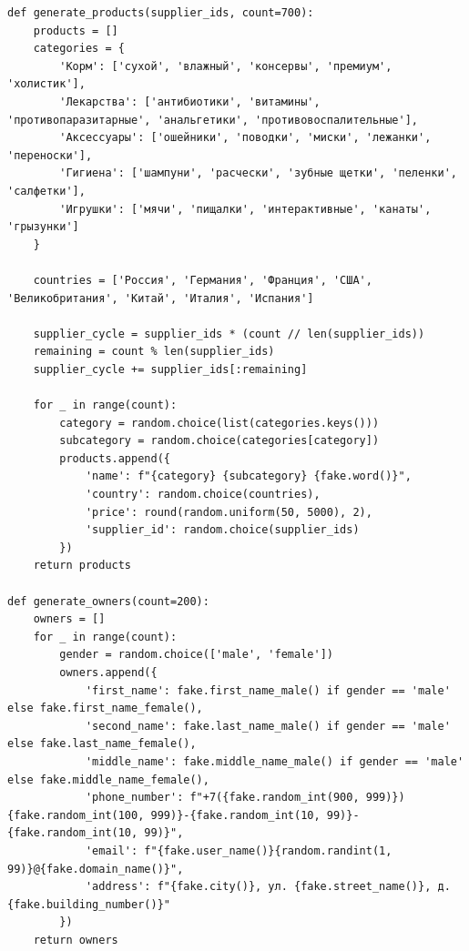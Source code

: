 \documentclass[a4paper]{article}
\begin{document}
\begin{lstlisting}[caption = Генерация значений для таблиц, basicstyle= \scriptsize \ttfamily]
def generate_products(supplier_ids, count=700):
    products = []
    categories = {
        'Корм': ['сухой', 'влажный', 'консервы', 'премиум', 'холистик'],
        'Лекарства': ['антибиотики', 'витамины', 'противопаразитарные', 'анальгетики', 'противовоспалительные'],
        'Аксессуары': ['ошейники', 'поводки', 'миски', 'лежанки', 'переноски'],
        'Гигиена': ['шампуни', 'расчески', 'зубные щетки', 'пеленки', 'салфетки'],
        'Игрушки': ['мячи', 'пищалки', 'интерактивные', 'канаты', 'грызунки']
    }
    
    countries = ['Россия', 'Германия', 'Франция', 'США', 'Великобритания', 'Китай', 'Италия', 'Испания']

    supplier_cycle = supplier_ids * (count // len(supplier_ids))
    remaining = count % len(supplier_ids)
    supplier_cycle += supplier_ids[:remaining]
    
    for _ in range(count):
        category = random.choice(list(categories.keys()))
        subcategory = random.choice(categories[category])
        products.append({
            'name': f"{category} {subcategory} {fake.word()}",
            'country': random.choice(countries),
            'price': round(random.uniform(50, 5000), 2),
            'supplier_id': random.choice(supplier_ids)
        })
    return products

def generate_owners(count=200):
    owners = []
    for _ in range(count):
        gender = random.choice(['male', 'female'])
        owners.append({
            'first_name': fake.first_name_male() if gender == 'male' else fake.first_name_female(),
            'second_name': fake.last_name_male() if gender == 'male' else fake.last_name_female(),
            'middle_name': fake.middle_name_male() if gender == 'male' else fake.middle_name_female(),
            'phone_number': f"+7({fake.random_int(900, 999)}){fake.random_int(100, 999)}-{fake.random_int(10, 99)}-{fake.random_int(10, 99)}",
            'email': f"{fake.user_name()}{random.randint(1, 99)}@{fake.domain_name()}",
            'address': f"{fake.city()}, ул. {fake.street_name()}, д. {fake.building_number()}"
        })
    return owners


\end{lstlisting}
\end{document}
